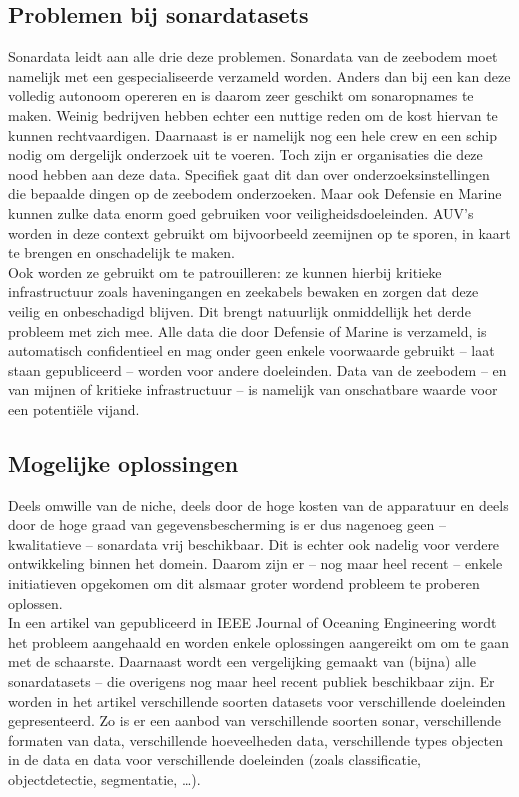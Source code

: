 \subsection{Problemen bij sonardatasets}

Sonardata leidt aan alle drie deze problemen. Sonardata van de zeebodem moet namelijk met een gespecialiseerde  verzameld worden. Anders dan bij een  kan deze volledig autonoom opereren en is daarom zeer geschikt om sonaropnames te maken. Weinig bedrijven hebben echter een nuttige reden om de kost hiervan te kunnen rechtvaardigen. Daarnaast is er namelijk nog een hele crew en een schip nodig om dergelijk onderzoek uit te voeren. Toch zijn er organisaties die deze nood hebben aan deze data. Specifiek gaat dit dan over onderzoeksinstellingen die bepaalde dingen op de zeebodem onderzoeken. Maar ook Defensie en Marine kunnen zulke data enorm goed gebruiken voor veiligheidsdoeleinden. AUV's worden in deze context gebruikt om bijvoorbeeld zeemijnen op te sporen, in kaart te brengen en onschadelijk te maken. \\

Ook worden ze gebruikt om te patrouilleren: ze kunnen hierbij kritieke infrastructuur zoals haveningangen en zeekabels bewaken en zorgen dat deze veilig en onbeschadigd blijven. Dit brengt natuurlijk onmiddellijk het derde probleem met zich mee. Alle data die door Defensie of Marine is verzameld, is automatisch confidentieel en mag onder geen enkele voorwaarde gebruikt -- laat staan gepubliceerd -- worden voor andere doeleinden. Data van de zeebodem -- en van mijnen of kritieke infrastructuur -- is namelijk van onschatbare waarde voor een potentiële vijand. \autocite{Aubard_2024_Datasets}

\subsection{Mogelijke oplossingen}

Deels omwille van de niche, deels door de hoge kosten van de apparatuur en deels door de hoge graad van gegevensbescherming is er dus nagenoeg geen -- kwalitatieve -- sonardata vrij beschikbaar. Dit is echter ook nadelig voor verdere ontwikkeling binnen het domein. Daarom zijn er -- nog maar heel recent -- enkele initiatieven opgekomen om dit alsmaar groter wordend probleem te proberen oplossen. \\

In een artikel van \textcite{Aubard_2024_Datasets} gepubliceerd in IEEE Journal of Oceaning Engineering wordt het probleem aangehaald en worden enkele oplossingen aangereikt om om te gaan met de schaarste. Daarnaast wordt een vergelijking gemaakt van (bijna) alle sonardatasets -- die overigens nog maar heel recent publiek beschikbaar zijn. Er worden in het artikel verschillende soorten datasets voor verschillende doeleinden gepresenteerd. Zo is er een aanbod van verschillende soorten sonar, verschillende formaten van data, verschillende hoeveelheden data, verschillende types objecten in de data en data voor verschillende doeleinden (zoals classificatie, objectdetectie, segmentatie, \dots). \\

